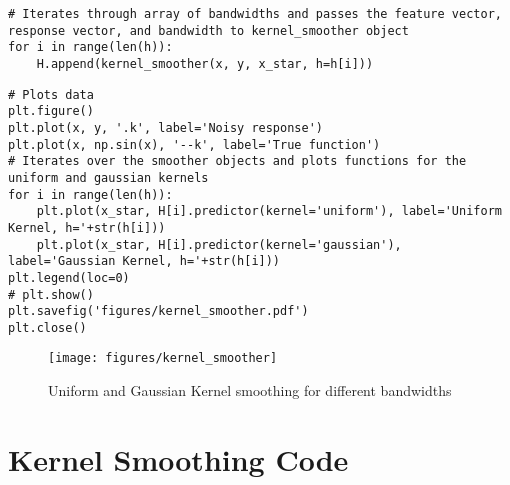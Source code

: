 \documentclass[10pt]{article}
\begin{document}
\begin{enumerate}[label=(\Alph*)]
\begin{lstlisting}
# Iterates through array of bandwidths and passes the feature vector, response vector, and bandwidth to kernel_smoother object
for i in range(len(h)):
    H.append(kernel_smoother(x, y, x_star, h=h[i]))
        \end{lstlisting}

        \begin{lstlisting}
# Plots data 
plt.figure()
plt.plot(x, y, '.k', label='Noisy response')
plt.plot(x, np.sin(x), '--k', label='True function')
# Iterates over the smoother objects and plots functions for the uniform and gaussian kernels
for i in range(len(h)):
    plt.plot(x_star, H[i].predictor(kernel='uniform'), label='Uniform Kernel, h='+str(h[i]))
    plt.plot(x_star, H[i].predictor(kernel='gaussian'), label='Gaussian Kernel, h='+str(h[i]))
plt.legend(loc=0)
# plt.show()
plt.savefig('figures/kernel_smoother.pdf')
plt.close()
        \end{lstlisting}

        \begin{figure}[ht] 
          \centering 
          \texttt{[image: figures/kernel\_smoother]}
          \caption{\label{fig:kernel_smoother}Uniform and Gaussian Kernel smoothing for different bandwidths}
        \end{figure}

    \end{enumerate}

    \clearpage
    \appendix
    \section{Kernel Smoothing Code}
\end{document}
